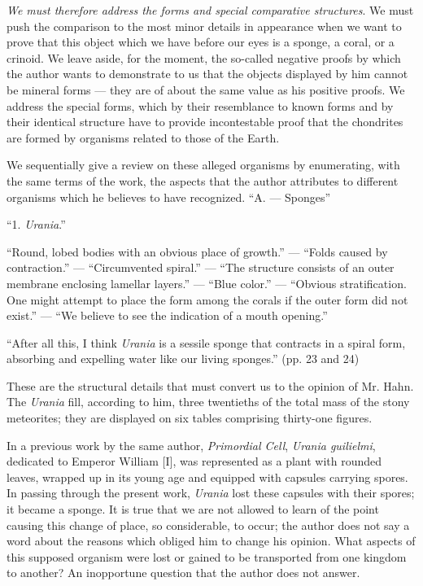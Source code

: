 \documentclass[a4paper, 12pt, oneside]{article}
\begin{document}
\emph{We must therefore address the forms and special comparative structures}. We must push the comparison to the most minor details in appearance when we want to prove that this object which we have before our eyes is a sponge, a coral, or a crinoid. We leave aside, for the moment, the so-called negative proofs by which the author wants to demonstrate to us that the objects displayed by him cannot be mineral forms --- they are of about the same value as his positive proofs. We address the special forms, which by their resemblance to known forms and by their identical structure have to provide incontestable proof that the chondrites are formed by organisms related to those of the Earth.

We sequentially give a review on these alleged organisms by enumerating, with the same terms of the work, the aspects that the author attributes to different organisms which he believes to have recognized.
\clearpage
``A. --- Sponges''

``1. \emph{Urania}.''

``Round, lobed bodies with an obvious place of growth.'' --- ``Folds caused by contraction.'' --- ``Circumvented spiral.'' --- ``The structure consists of an outer membrane enclosing lamellar layers.'' --- ``Blue color.'' --- ``Obvious stratification. One might attempt to place the form among the corals if the outer form did not exist.'' --- ``We believe to see the indication of a mouth opening.''

``After all this, I think \emph{Urania} is a sessile sponge that contracts in a spiral form, absorbing and expelling water like our living sponges.'' (pp. 23 and 24)

These are the structural details that must convert us to the opinion of Mr. Hahn. The \emph{Urania} fill, according to him, three twentieths of the total mass of the stony meteorites; they are displayed on six tables comprising thirty-one figures.

In a previous work by the same author, \emph{Primordial Cell}, \emph{Urania guilielmi}, dedicated to Emperor William [I], was represented as a plant with rounded leaves, wrapped up in its young age and equipped with capsules carrying spores. In passing through the present work, \emph{Urania} lost these capsules with their spores; it became a sponge. It is true that we are not allowed to learn of the point causing this change of place, so considerable, to occur; the author does not say a word about the reasons which obliged him to change his opinion. What aspects of this supposed organism were lost or gained to be transported from one kingdom to another? An inopportune question that the author does not answer.
\end{document}
